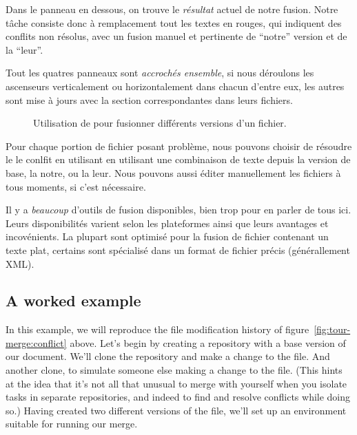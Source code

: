 Dans le panneau en dessous, on trouve le \emph{résultat} actuel de notre
fusion. Notre tâche consiste donc à remplacement tout les textes en rouges,
qui indiquent des conflits non résolus, avec un fusion manuel et pertinente
de ``notre'' version et de la ``leur''. 

Tout les quatres panneaux sont \emph{accrochés ensemble}, si nous déroulons
les ascenseurs verticalement ou horizontalement dans chacun d'entre eux, les
autres sont mise à jours avec la section correspondantes dans leurs fichiers.

\begin{figure}[ht]
  \centering
  \caption{Utilisation de   pour fusionner différents versions
  d'un fichier.}
  \label{fig:tour-merge:kdiff3}
\end{figure}

Pour chaque portion de fichier posant problème, nous pouvons choisir 
de résoudre le le conlfit en utilisant en utilisant une combinaison 
de texte depuis la version de base, la notre, ou la leur. Nous pouvons 
aussi éditer manuellement les fichiers à tous moments, si c'est
nécessaire.

Il y a \emph{beaucoup} d'outils de fusion disponibles, bien trop pour
en parler de tous ici. Leurs disponibilités varient selon les plateformes
ainsi que leurs avantages et incovénients. La plupart sont optimisé pour
la fusion de fichier contenant un texte plat, certains sont spécialisé
dans un format de fichier précis (générallement XML).

\subsection{A worked example}

In this example, we will reproduce the file modification history of
figure~\ref{fig:tour-merge:conflict} above.  Let's begin by creating a
repository with a base version of our document.
We'll clone the repository and make a change to the file.
And another clone, to simulate someone else making a change to the
file.  (This hints at the idea that it's not all that unusual to merge
with yourself when you isolate tasks in separate repositories, and
indeed to find and resolve conflicts while doing so.)
Having created two different versions of the file, we'll set up an
environment suitable for running our merge.

